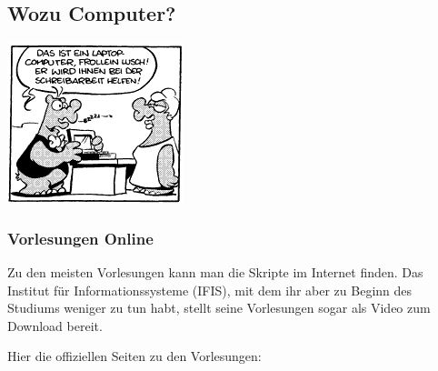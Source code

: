\subsection{Wozu Computer?}
 \begin{center}
 \includegraphics[width = 0.75\linewidth]{bilder/comics/otto1_1.png}
 \end{center}
\subsubsection{Vorlesungen Online}
Zu den meisten Vorlesungen kann man die Skripte im Internet finden. Das Institut 
für Informationssysteme (IFIS), mit dem ihr aber zu Beginn des Studiums 
weniger zu tun habt, stellt seine Vorlesungen sogar als Video zum Download bereit.

Hier die offiziellen Seiten zu den Vorlesungen:


